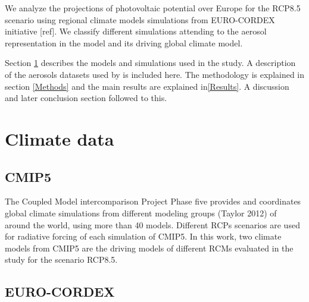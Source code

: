    
   We analyze the projections of photovoltaic potential over Europe for the RCP8.5 scenario using regional climate models simulations from EURO-CORDEX initiative [ref]. We classify different simulations attending to the aerosol representation in the model and its driving global climate model.

   Section \ref{Climate data} describes the models and simulations used in the study. A description of the aerosols datasets used by is included here. The methodology is explained in section \ref{Methods} and the main results are explained in\ref{Results}. A discussion and later conclusion section followed to this.

{\section{Climate data}\label{Climate data}}

\subsection{CMIP5}

The Coupled Model intercomparison Project Phase five provides and coordinates global climate simulations from different modeling groups (Taylor 2012) of around the world, using more than 40 models. Different RCPs scenarios are used for radiative forcing of each simulation of CMIP5. In this work, two climate models from CMIP5 are the driving models of different RCMs evaluated in the study for the scenario RCP8.5.

\subsection{EURO-CORDEX}

